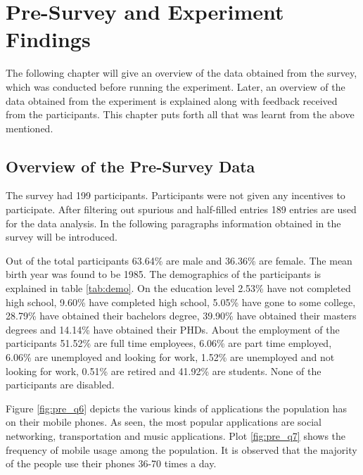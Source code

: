 \chapter{Pre-Survey and Experiment Findings}
The following chapter will give an overview of the data obtained from the survey, which was conducted before running the experiment.
Later, an overview of the data obtained from the experiment is explained along with feedback received from the participants. This chapter puts forth
all that was learnt from the above mentioned.

\section{Overview of the Pre-Survey Data}
The survey had 199 participants. Participants were not given any incentives to participate. After filtering out spurious and half-filled entries 189 entries are used for the data analysis. In the following paragraphs information obtained in the survey will be introduced.

Out of the total
participants 63.64\% are male and 36.36\% are female. The mean birth year was found to be 1985. The demographics of the participants is explained in table \ref{tab:demo}. On the education level 2.53\% have not completed high school, 9.60\% have completed high school, 5.05\% have gone to some college, 28.79\% have obtained their bachelors degree, 39.90\% have obtained their masters degrees and 14.14\% have obtained their PHDs. About the employment of the participants 51.52\% are full time employees, 6.06\% are part time employed, 6.06\% are unemployed and looking for work, 1.52\% are unemployed and not looking for work, 0.51\% are retired and 41.92\% are students. None of the participants are disabled. 

Figure \ref{fig:pre_q6} depicts the various kinds of applications the population has on their mobile phones. As seen, the most popular applications are social networking, transportation and music applications. Plot \ref{fig:pre_q7} shows the frequency of mobile usage among the population. It is observed that the majority of the people use their phones 36-70 times a day.

